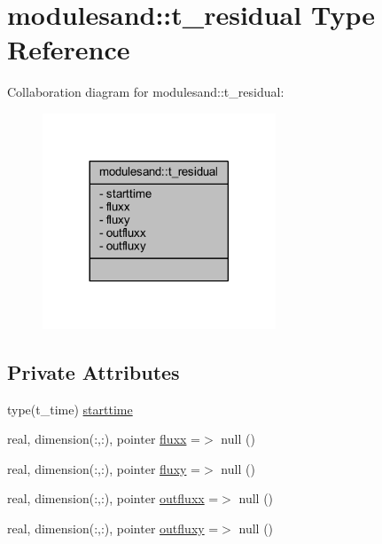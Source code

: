 \hypertarget{structmodulesand_1_1t__residual}{}\section{modulesand\+:\+:t\+\_\+residual Type Reference}
\label{structmodulesand_1_1t__residual}


Collaboration diagram for modulesand\+:\+:t\+\_\+residual\+:\nopagebreak
\begin{figure}[H]
\begin{center}
\leavevmode
\includegraphics[width=197pt]{structmodulesand_1_1t__residual__coll__graph}
\end{center}
\end{figure}
\subsection*{Private Attributes}
\begin{DoxyCompactItemize}
\item 
type(t\+\_\+time) \mbox{\hyperlink{structmodulesand_1_1t__residual_ad28ac6ca919edd40b3fd78aa953eee6f}{starttime}}
\item 
real, dimension(\+:,\+:), pointer \mbox{\hyperlink{structmodulesand_1_1t__residual_a5ddb2aaea4e8807cad394d7d5b724685}{fluxx}} =$>$ null ()
\item 
real, dimension(\+:,\+:), pointer \mbox{\hyperlink{structmodulesand_1_1t__residual_a6449a4e0b141a48ec180dce63651e139}{fluxy}} =$>$ null ()
\item 
real, dimension(\+:,\+:), pointer \mbox{\hyperlink{structmodulesand_1_1t__residual_a3eecfb76844e140da386d8cb055cf383}{outfluxx}} =$>$ null ()
\item 
real, dimension(\+:,\+:), pointer \mbox{\hyperlink{structmodulesand_1_1t__residual_a1b44dcc48fb0a2f5a7445c5bf63d8c4f}{outfluxy}} =$>$ null ()
\end{DoxyCompactItemize}


